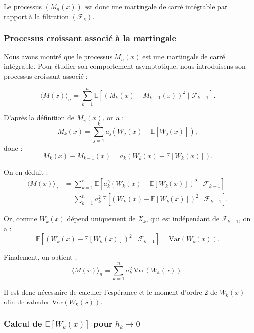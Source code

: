 \documentclass[12pt]{article}
\begin{document}
Le processus \( (M_n(x)) \) est donc une martingale de carré intégrable par rapport à la filtration \( (\mathcal{F}_n) \).



\subsubsection*{Processus croissant associé à la martingale}
\setcounter{equation}{0}
Nous avons montré  que le processus \( M_n(x) \) est une martingale de carré intégrable.  
Pour étudier son comportement asymptotique, nous introduisons son processus croissant associé :

\begin{equation}
\langle M(x) \rangle_n = \sum_{k=1}^n \mathbb{E} \left[ (M_k(x) - M_{k-1}(x))^2 \mid \mathcal{F}_{k-1} \right].
\end{equation}

D'après la définition de \( M_n(x) \), on a :
\[
M_k(x) = \sum_{j=1}^k a_j \left( W_j(x) - \mathbb{E}[W_j(x)] \right),
\]
donc :
\[
M_k(x) - M_{k-1}(x) = a_k \left( W_k(x) - \mathbb{E}[W_k(x)] \right).
\]

On en déduit :
\begin{align}
\langle M(x) \rangle_n 
&= \sum_{k=1}^n \mathbb{E} \left[ a_k^2 \left( W_k(x) - \mathbb{E}[W_k(x)] \right)^2 \mid \mathcal{F}_{k-1} \right] \\
&= \sum_{k=1}^n a_k^2 \, \mathbb{E} \left[ \left( W_k(x) - \mathbb{E}[W_k(x)] \right)^2 \mid \mathcal{F}_{k-1} \right].
\end{align}

Or, comme \( W_k(x) \) dépend uniquement de \( X_k \), qui est indépendant de \( \mathcal{F}_{k-1} \), on a :
\[
\mathbb{E} \left[ \left( W_k(x) - \mathbb{E}[W_k(x)] \right)^2 \mid \mathcal{F}_{k-1} \right] = \mathrm{Var}(W_k(x)).
\]

Finalement, on obtient :
\begin{equation}
\langle M(x) \rangle_n = \sum_{k=1}^n a_k^2 \, \mathrm{Var}(W_k(x)). \label{eq:croissance}
\end{equation}

Il est donc nécessaire de calculer l’espérance et le moment d’ordre 2 de \( W_k(x) \) afin de calculer \( \mathrm{Var}(W_k(x)) \).


\subsubsection*{Calcul de \( \mathbb{E}[W_k(x)] \) pour \( h_k \to 0 \)}
\setcounter{equation}{0}
\end{document}
